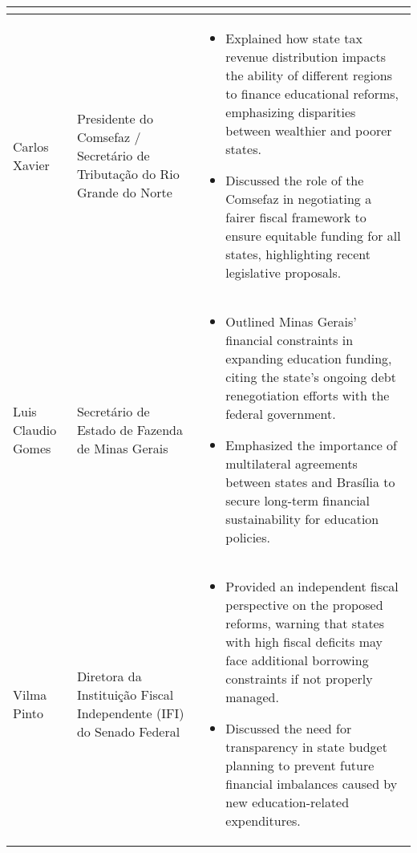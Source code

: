 \documentclass[a4paper,10pt]{article}
\begin{document}
\begin{table}[htbp!]
\begin{tabular}{|p{1.2in}|p{1.6in}|p{4.2in}|}
\begin{itemize}
\end{itemize}\\
\hline
Carlos Xavier & Presidente do Comsefaz / Secretário de Tributação do Rio Grande do Norte & \begin{itemize}
\item Explained how state tax revenue distribution impacts the ability of different regions to finance educational reforms, emphasizing disparities between wealthier and poorer states.
\item Discussed the role of the Comsefaz in negotiating a fairer fiscal framework to ensure equitable funding for all states, highlighting recent legislative proposals.
\end{itemize}\\
\hline
Luis Claudio Gomes & Secretário de Estado de Fazenda de Minas Gerais & \begin{itemize}
\item Outlined Minas Gerais’ financial constraints in expanding education funding, citing the state’s ongoing debt renegotiation efforts with the federal government.
\item Emphasized the importance of multilateral agreements between states and Brasília to secure long-term financial sustainability for education policies.
\end{itemize}\\
\hline
Vilma Pinto & Diretora da Instituição Fiscal Independente (IFI) do Senado Federal & \begin{itemize}
\item Provided an independent fiscal perspective on the proposed reforms, warning that states with high fiscal deficits may face additional borrowing constraints if not properly managed.
\item Discussed the need for transparency in state budget planning to prevent future financial imbalances caused by new education-related expenditures.
\end{itemize}\\
\hline
\end{tabular}
\end{table}
\end{document}
